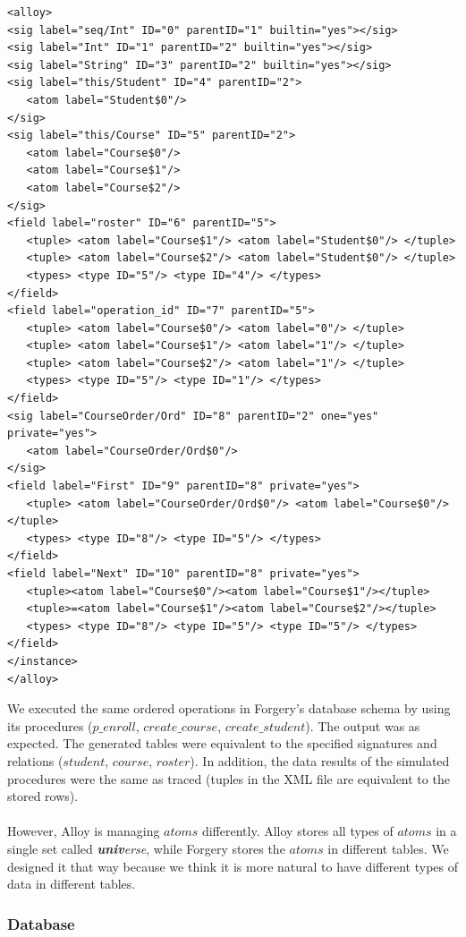 \documentclass[oneside]{book}
\begin{document}
\begin{lstlisting}
<alloy>
<sig label="seq/Int" ID="0" parentID="1" builtin="yes"></sig>
<sig label="Int" ID="1" parentID="2" builtin="yes"></sig>
<sig label="String" ID="3" parentID="2" builtin="yes"></sig>
<sig label="this/Student" ID="4" parentID="2">
   <atom label="Student$0"/>
</sig>
<sig label="this/Course" ID="5" parentID="2">
   <atom label="Course$0"/>
   <atom label="Course$1"/>
   <atom label="Course$2"/>
</sig>
<field label="roster" ID="6" parentID="5">
   <tuple> <atom label="Course$1"/> <atom label="Student$0"/> </tuple>
   <tuple> <atom label="Course$2"/> <atom label="Student$0"/> </tuple>
   <types> <type ID="5"/> <type ID="4"/> </types>
</field>
<field label="operation_id" ID="7" parentID="5">
   <tuple> <atom label="Course$0"/> <atom label="0"/> </tuple>
   <tuple> <atom label="Course$1"/> <atom label="1"/> </tuple>
   <tuple> <atom label="Course$2"/> <atom label="1"/> </tuple>
   <types> <type ID="5"/> <type ID="1"/> </types>
</field>
<sig label="CourseOrder/Ord" ID="8" parentID="2" one="yes" private="yes">
   <atom label="CourseOrder/Ord$0"/>
</sig>
<field label="First" ID="9" parentID="8" private="yes">
   <tuple> <atom label="CourseOrder/Ord$0"/> <atom label="Course$0"/> </tuple>
   <types> <type ID="8"/> <type ID="5"/> </types>
</field>
<field label="Next" ID="10" parentID="8" private="yes">
   <tuple><atom label="Course$0"/><atom label="Course$1"/></tuple>
   <tuple>=<atom label="Course$1"/><atom label="Course$2"/></tuple>
   <types> <type ID="8"/> <type ID="5"/> <type ID="5"/> </types>
</field>
</instance>
</alloy>
\end{lstlisting}

We executed the same ordered operations in Forgery's database schema by using its procedures ($p\_enroll$, $create\_course$, $create\_student$).  The output was as expected. The generated tables were equivalent to the specified signatures and relations ($student$, $course$, $roster$). In addition, the data results of the simulated procedures were the same as traced (tuples in the XML file are equivalent to the stored rows).\\\\
However, Alloy is managing $atoms$ differently. Alloy stores all types of $atoms$ in a single set called \textit{\textbf{univ}erse}, while Forgery stores the $atoms$ in different tables. We designed it that way because we think it is more natural to have different types of data in different tables.

\subsubsection{Database}
\end{document}
